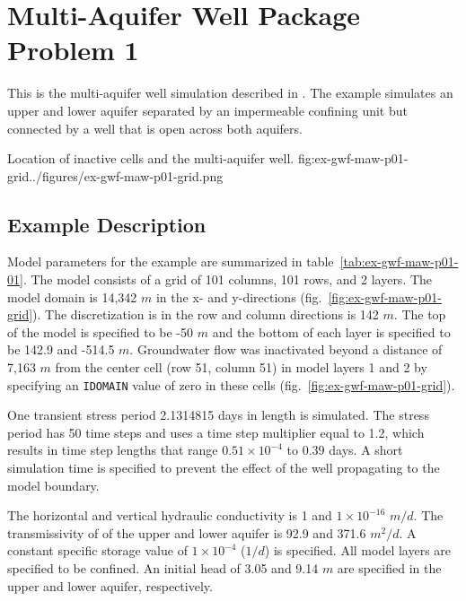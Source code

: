\section{Multi-Aquifer Well Package Problem 1}

This is the multi-aquifer well simulation described in \cite{nevilletonkin2004}. The example simulates an upper and lower aquifer separated by an impermeable confining unit but connected by a well that is open across both aquifers.                                

\begin{StandardFigure}{
                                     Location of inactive cells and the multi-aquifer well. 
                                     }{fig:ex-gwf-maw-p01-grid}{../figures/ex-gwf-maw-p01-grid.png}
\end{StandardFigure}   


\subsection{Example Description}
Model parameters for the example are summarized in table~\ref{tab:ex-gwf-maw-p01-01}.  The model consists of a grid of 101 columns, 101 rows, and 2 layers. The model domain is 14,342 $m$ in the x- and y-directions (fig.~\ref{fig:ex-gwf-maw-p01-grid}). The discretization is in the row and column directions is 142 $m$. The top of the model is specified to be -50 $m$ and the bottom of each layer is specified to be 142.9 and -514.5 $m$. Groundwater flow was inactivated beyond a distance of 7,163 $m$ from the center cell (row 51, column 51) in model layers 1 and 2 by specifying an \texttt{IDOMAIN} value of zero in these cells (fig.~\ref{fig:ex-gwf-maw-p01-grid}).

One transient stress period 2.1314815 days in length is simulated. The stress period has 50 time steps and uses a time step multiplier equal to 1.2, which results in time step lengths that range $0.51 \times 10^{-4}$ to $0.39$ days. A short simulation time is specified to prevent the effect of the well propagating to the model boundary.



The horizontal and vertical hydraulic conductivity is 1 and $1 \times 10^{-16}$ $m/d$. The transmissivity of of the upper and lower aquifer is 92.9 and 371.6 $m^2/d$. A constant specific storage value of $1 \times 10^{-4}$ ($1/d$) is specified. All model layers are specified to be confined. An initial head of 3.05 and 9.14 $m$ are specified in the upper and lower aquifer, respectively. 

